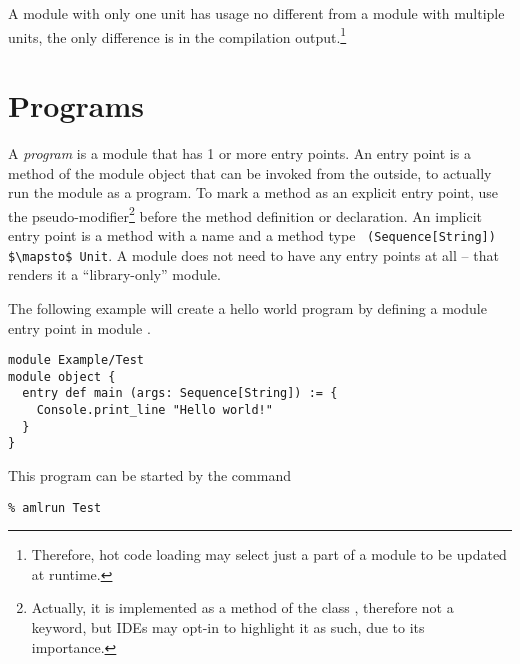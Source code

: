 A module with only one unit has usage no different from a module with multiple units, the only difference is in the compilation output.\footnote{Therefore, hot code loading may select just a part of a module to be updated at runtime.}





\section{Programs}
\label{sec:programs}

A {\em program} is a module that has 1 or more entry points. An entry point is a method of the module object that can be invoked from the outside, to actually run the module as a program. To mark a method as an explicit entry point, use the  pseudo-modifier\footnote{Actually, it is implemented as a method of the class , therefore not a keyword, but IDEs may opt-in to highlight it as such, due to its importance.} before the method definition or declaration. An implicit entry point is a method with a name  and a method type ~\lstinline!(Sequence[String]) $\mapsto$ Unit!. A module does not need to have any entry points at all -- that renders it a ``library-only'' module. 

\example The following example will create a hello world program by defining a module entry point in module . 

\syntax\begin{lstlisting}[morekeywords={entry}]
module Example/Test
module object {
  entry def main (args: Sequence[String]) := {
    Console.print_line "Hello world!"
  }
}
\end{lstlisting}

This program can be started by the command
\begin{lstlisting}
% amlrun Test
\end{lstlisting}








